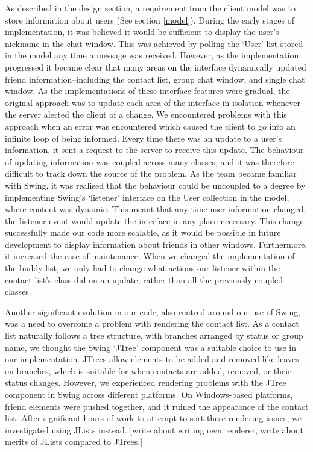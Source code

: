 As described in the design section, a requirement from the client model was to store information about users (See section \ref{model}). During the early stages of implementation, it was believed it would be sufficient to display the user's nickname in the chat window. This was achieved by polling the `User' list stored in the model any time a message was received. However, as the implementation progressed it became clear that many areas on the interface dynamically updated friend information--including the contact list, group chat window, and single chat window. As the implementations of these interface features were gradual, the original approach was to update each area of the interface in isolation whenever the server alerted the client of a change. We encountered problems with this approach when an error was encountered which caused the client to go into an infinite loop of being informed. Every time there was an update to a user's information, it sent a request to the server to receive this update. The behaviour of updating information was coupled across many classes, and it was therefore difficult to track down the source of the problem. As the team became familiar with Swing, it was realised that the behaviour could be uncoupled to a degree by implementing Swing's `listener' interface on the User collection in the model, where content was dynamic. This meant that any time user information changed, the listener event would update the interface in any place necessary. This change successfully made our code more scalable, as it would be possible in future development to display information about friends in other windows. Furthermore, it increased the ease of maintenance. When we changed the implementation of the buddy list, we only had to change what actions our listener within the contact list's class did on an update, rather than all the previously coupled classes. 

Another significant evolution in our code, also centred around our use of Swing, was a need to overcome a problem with rendering the contact list. As a contact list naturally follows a tree structure, with branches arranged by status or group name, we thought the Swing `JTree' component was a suitable choice to use in our implementation. JTrees allow elements to be added and removed like leaves on branches, which is suitable for when contacts are added, removed, or their status changes. However, we experienced rendering problems with the JTree component in Swing across different platforms. On Windows-based platforms, friend elements were pushed together, and it ruined the appearance of the contact list. After significant hours of work to attempt to sort these rendering issues, we investigated using JLists instead. [write about writing own renderer, write about merits of JLists compared to JTrees.]

